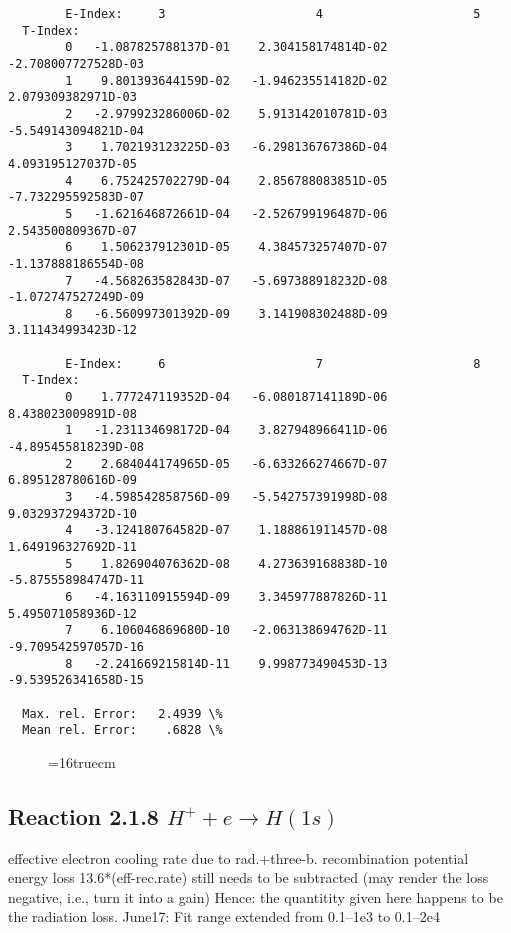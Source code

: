 \documentclass[12pt,dvipdfmx]{article}
\begin{document}
{\begin{small}
\begin{verbatim}
        E-Index:     3                     4                     5
  T-Index:
        0   -1.087825788137D-01    2.304158174814D-02   -2.708007727528D-03
        1    9.801393644159D-02   -1.946235514182D-02    2.079309382971D-03
        2   -2.979923286006D-02    5.913142010781D-03   -5.549143094821D-04
        3    1.702193123225D-03   -6.298136767386D-04    4.093195127037D-05
        4    6.752425702279D-04    2.856788083851D-05   -7.732295592583D-07
        5   -1.621646872661D-04   -2.526799196487D-06    2.543500809367D-07
        6    1.506237912301D-05    4.384573257407D-07   -1.137888186554D-08
        7   -4.568263582843D-07   -5.697388918232D-08   -1.072747527249D-09
        8   -6.560997301392D-09    3.141908302488D-09    3.111434993423D-12

        E-Index:     6                     7                     8
  T-Index:
        0    1.777247119352D-04   -6.080187141189D-06    8.438023009891D-08
        1   -1.231134698172D-04    3.827948966411D-06   -4.895455818239D-08
        2    2.684044174965D-05   -6.633266274667D-07    6.895128780616D-09
        3   -4.598542858756D-09   -5.542757391998D-08    9.032937294372D-10
        4   -3.124180764582D-07    1.188861911457D-08    1.649196327692D-11
        5    1.826904076362D-08    4.273639168838D-10   -5.875558984747D-11
        6   -4.163110915594D-09    3.345977887826D-11    5.495071058936D-12
        7    6.106046869680D-10   -2.063138694762D-11   -9.709542597057D-16
        8   -2.241669215814D-11    9.998773490453D-13   -9.539526341658D-15

  Max. rel. Error:   2.4939 \%
  Mean rel. Error:    .6828 \%

\end{verbatim}\end{small}
\begin{figure} \label{2.1.5io}
\epsfxsize=16truecm
\end{figure}
\newpage

\subsection{
  Reaction 2.1.8  $H^+ + e  \rightarrow H(1s) $
}

   effective electron cooling rate due to rad.+three-b. recombination
   potential energy loss 13.6*(eff-rec.rate) still needs to be
   subtracted (may render the loss negative, i.e., turn it into a gain)
   Hence: the quantitity given here happens to be the radiation loss.
   June17: Fit range extended from 0.1--1e3 to 0.1--2e4

}
\end{document}
